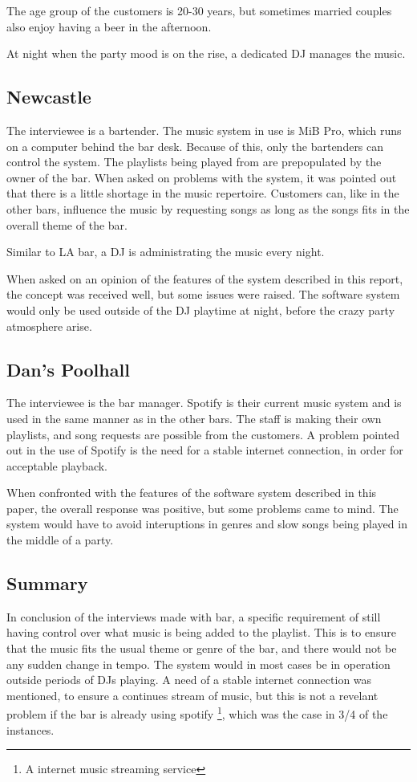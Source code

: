 The age group of the customers is 20-30 years, but sometimes married couples also enjoy having a beer in the afternoon.

At night when the party mood is on the rise, a dedicated DJ manages the music.

\subsection{Newcastle}
\label{sub:newcastle}

The interviewee is a bartender. The music system in use is MiB Pro, which runs on a computer behind the bar desk. Because of this, only the bartenders can control the system. The playlists being played from are prepopulated by the owner of the bar. When asked on problems with the system, it was pointed out that there is a little shortage in the music repertoire. Customers can, like in the other bars, influence the music by requesting songs as long as the songs fits in the overall theme of the bar.

Similar to LA bar, a DJ is administrating the music every night.

When asked on an opinion of the features of the system described in this report, the concept was received well, but some issues were raised. The software system would only be used outside of the DJ playtime at night, before the crazy party atmosphere arise.

\subsection{Dan's Poolhall}
\label{sub:dan_s_poolhall}

The interviewee is the bar manager. Spotify is their current music system and is used in the same manner as in the other bars. The staff is making their own playlists, and song requests are possible from the customers. A problem pointed out in the use of Spotify is the need for a stable internet connection, in order for acceptable playback. 

When confronted with the features of the software system described in this paper, the overall response was positive, but some problems came to mind. The system would have to avoid interuptions in genres and slow songs being played in the middle of a party.

\subsection{Summary}
\label{sub:summary}

In conclusion of the interviews made with bar, a specific requirement of still having control over what music is being added to the playlist. This is to ensure that the music fits the usual theme or genre of the bar, and there would not be any sudden change in tempo. The system would in most cases be in operation outside periods of DJs playing. A need of a stable internet connection was mentioned, to ensure a continues stream of music, but this is not a revelant problem  if the bar is already using spotify \footnote{A internet music streaming service}, which was the case in 3/4 of the instances.
